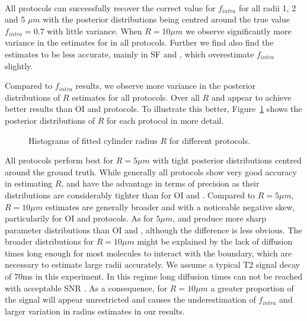 \paragraph{} All protocols can successfully recover the correct value for $f_{intra}$ for all radii 1, 2 and 5 $\mu m$ with the posterior distributions being centred around the true value $f_{intra}=0.7$ with little variance. When $R=10\mu m$ we observe significantly more variance in the estimates for in all protocols. Further we find also find the estimates to be less accurate, mainly in {\gls{SF}} and {\SD}, which overestimate $f_{intra}$ slightly.


Compared to $f_{intra}$ results, we observe more variance in the posterior distributions of $R$ estimates for all protocols. Over all $R$ {\DO} and {\FD} appear to achieve better results than {\gls{OI}} and {\SD} protocols. To illustrate this better, Figure~\ref{fig:chapter7 exp1 histograms 60mT} shows the posterior distributions of $R$ for each protocol in more detail.

\begin{figure}[H]
	 \centering
	 
	 \caption{Histograms of fitted cylinder radius $R$ for different protocols.}
	 \label{fig:chapter7 exp1 histograms 60mT}
\end{figure}

All protocols perform best for $R=5\mu m$ with tight posterior distributions centred around the ground truth. While generally all protocols show very good accuracy in estimating $R$, {\DO} and {\FD} have the advantage in terms of precision as their distributions are considerably tighter than for {\gls{OI}} and {\SD}. Compared to $R=5\mu m$, $R=10\mu m$ estimates are generally broader and with a noticeable  negative skew, particularily for {\gls{OI}} and {\SD} protocols.  As for $5\mu m$, {\DO} and {\FD} produce more sharp parameter distributions than {\gls{OI}} and {\SD}, although the difference is less obvious. The broader distributions for $R=10\mu m$ might be explained by the lack of diffusion times long enough for most molecules to interact with the boundary, which are necessary to estimate large radii accurately.  We assume a typical T2 signal decay of 70ms in this experiment. In this regime long diffusion times can not be reached with acceptable \gls{SNR} \citep{Zhang:2011a}. As a consequence, for $R=10\mu m$ a greater proportion of the signal will appear unrestricted and causes the underestimation of $f_{intra}$ and larger variation in radius estimates in our results.

